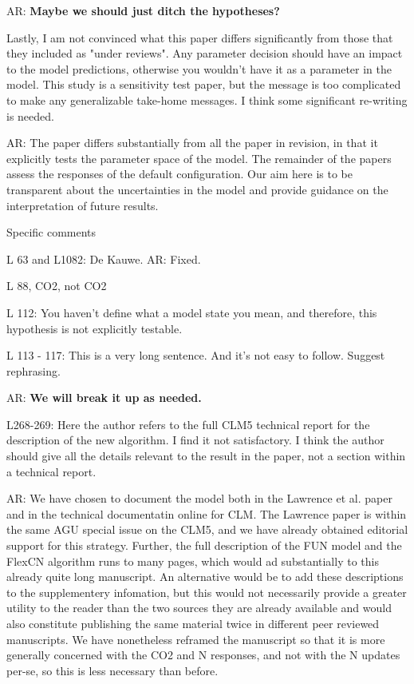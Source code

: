 \documentclass{article}
\begin{document}
\textsf{AR: \textbf{Maybe we should just ditch the hypotheses? }}

Lastly, I am not convinced what this paper differs significantly from those that they included as "under reviews". Any parameter decision should have an impact to the model predictions, otherwise you wouldn't have it as a parameter in the model. This study is a sensitivity test paper, but the message is too complicated to make any generalizable take-home messages. I think some significant re-writing is needed. 

\textsf{AR: The paper differs substantially from all the paper in revision, in that it explicitly tests the parameter space of the model.  The remainder of the papers assess the responses of the default configuration. Our aim here is to be transparent about the uncertainties in the model and provide guidance on the interpretation of future results.} 

Specific comments 

L 63 and L1082: De Kauwe. 
\textsf{AR: Fixed.}

L 88, CO2, not CO2 

L 112: You haven't define what a model state you mean, and therefore, this hypothesis is not explicitly testable. 

L 113 - 117: This is a very long sentence. And it's not easy to follow. Suggest rephrasing.

\textsf{AR:\textbf{ We will break it up as needed. }}

L268-269: Here the author refers to the full CLM5 technical report for the description of the new algorithm. I find it not satisfactory. I think the author should give all the details relevant to the result in the paper, not a section within a technical report. 

\textsf{AR: We have chosen to document the model both in the Lawrence et al. paper and in the technical documentatin online for CLM. The Lawrence paper is within the same AGU special issue on the CLM5, and we have already obtained editorial support for this strategy.  Further, the full description of the FUN model and the FlexCN algorithm runs to many pages, which would ad substantially to this already quite long manuscript. An alternative would be to add these descriptions to the supplementery infomation, but this would not necessarily provide a greater utility to the reader than the two sources they are already available and would also constitute publishing the same material twice in different peer reviewed manuscripts.  We have nonetheless reframed the manuscript so that it is more generally concerned with the CO2 and N responses, and not with the N updates per-se, so this is less necessary than before. }
\end{document}
